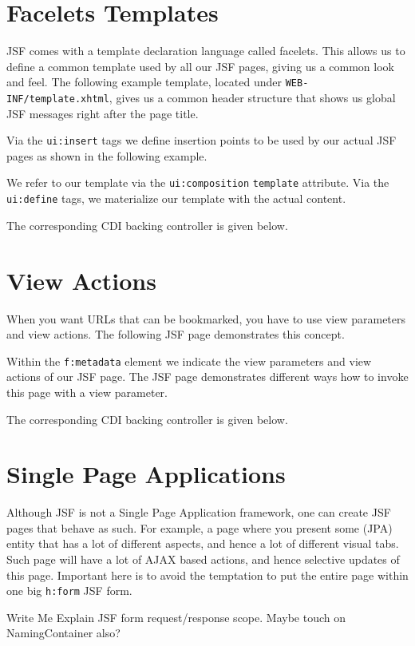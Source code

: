 \section{Facelets Templates}
JSF comes with a template declaration language called facelets.
This allows us to define a common template used by all our JSF pages,
giving us a common look and feel.
The following example template, located under \texttt{WEB-INF/template.xhtml},
gives us a common header structure that shows us global JSF messages right after the page title.

Via the \texttt{ui:insert} tags we define insertion points to be used by our actual JSF pages as shown in the following example.

We refer to our template via the \texttt{ui:composition} \texttt{template} attribute.
Via the \texttt{ui:define} tags, we materialize our template with the actual content.

The corresponding CDI backing controller is given below.


\section{View Actions}
When you want URLs that can be bookmarked, you have to use view parameters and view actions.
The following JSF page demonstrates this concept.

Within the \texttt{f:metadata} element we indicate the view parameters and view actions of our JSF page.
The JSF page demonstrates different ways how to invoke this page with a view parameter.

The corresponding CDI backing controller is given below.


\section{Single Page Applications}
Although JSF is not a Single Page Application framework, one can create JSF pages that behave as such.
For example, a page where you present some (JPA) entity that has a lot of different aspects, and hence a lot of different visual tabs.
Such page will have a lot of AJAX based actions, and hence selective updates of this page.
Important here is to avoid the temptation to put the entire page within one big \texttt{h:form} JSF form.
\begin{TODO}{Write Me}
Explain JSF form request/response scope.
Maybe touch on NamingContainer also?
\end{TODO}